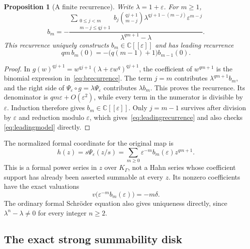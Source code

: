 \documentclass[11pt,a4paper]{article}
\numberwithin{equation}{section}
\newtheorem{proposition}[theorem]{Proposition}
\theoremstyle{definition}
\theoremstyle{remark}
\newcommand{\C}{\mathbb C}
\newcommand{\K}{K_\Gamma}
\newcommand{\m}{\mathfrak m_\Gamma}
\newcommand{\eps}{\varepsilon}
\begin{document}
\begin{proposition}[A finite recurrence]
\label{prop:recurrence}
Write $\lambda=1+\eps$.  For $m\ge1$,
\begin{equation}\label{eq:brecurrence}
 b_m=-\frac{
  \displaystyle\sum_{\substack{0\le j<m\\m-j\le qj+1}}
     b_j\binom{qj+1}{m-j}
       \lambda^{qj+1-(m-j)}\eps^{m-j}}
 {\lambda^{qm+1}-\lambda}.
\end{equation}
This recurrence uniquely constructs $b_m\in\C[[\eps]]$ and has leading
recurrence
\begin{equation}\label{eq:leadingrecurrence}
 qm\,b_m(0)=-\bigl(q(m-1)+1\bigr)b_{m-1}(0).
\end{equation}
\end{proposition}

\begin{proof}
In $g(w)^{qj+1}=w^{qj+1}(\lambda+\eps w^q)^{qj+1}$, the coefficient of
$w^{qm+1}$ is the binomial expression in~\eqref{eq:brecurrence}.
The term $j=m$ contributes $\lambda^{qm+1}b_m$, and the right side of
$\Psi_\eps\circ g=\lambda\Psi_\eps$ contributes $\lambda b_m$.
This proves the recurrence.  Its denominator is
$qm\eps+O(\eps^2)$, while every term in the numerator is divisible by
$\eps$.  Induction therefore gives $b_m\in\C[[\eps]]$.
Only $j=m-1$ survives after division by $\eps$ and reduction modulo $\eps$,
which gives~\eqref{eq:leadingrecurrence} and also checks
\eqref{eq:leadingmodel} directly.
\end{proof}

The normalized formal coordinate for the original map is
\begin{equation}\label{eq:originalh}
 h(z)=s\Psi_\eps(z/s)
      =\sum_{m\ge0}\eps^{-m}b_m(\eps)z^{qm+1}.
\end{equation}
This is a formal power series in $z$ over $\K$, not a Hahn series whose
coefficient support has already been asserted summable at every $z$.
Its nonzero coefficients have the exact valuations
\begin{equation}\label{eq:coefvaluation}
 v\bigl(\eps^{-m}b_m(\eps)\bigr)=-m\delta.
\end{equation}
The ordinary formal Schr\"oder equation also gives uniqueness directly,
since $\lambda^n-\lambda\ne0$ for every integer $n\ge2$.

\subsection{The exact strong summability disk}
\end{document}
